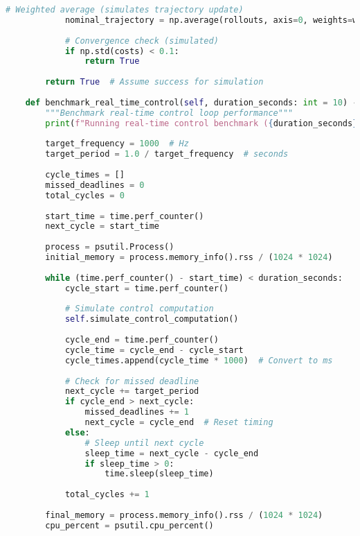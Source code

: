 \begin{lstlisting}[language=Python, caption={Performance Benchmark Script}, label={lst:app-benchmark-script}]
            # Weighted average (simulates trajectory update)
            nominal_trajectory = np.average(rollouts, axis=0, weights=weights)
            
            # Convergence check (simulated)
            if np.std(costs) < 0.1:
                return True
        
        return True  # Assume success for simulation
    
    def benchmark_real_time_control(self, duration_seconds: int = 10) -> BenchmarkResult:
        """Benchmark real-time control loop performance"""
        print(f"Running real-time control benchmark ({duration_seconds}s)...")
        
        target_frequency = 1000  # Hz
        target_period = 1.0 / target_frequency  # seconds
        
        cycle_times = []
        missed_deadlines = 0
        total_cycles = 0
        
        start_time = time.perf_counter()
        next_cycle = start_time
        
        process = psutil.Process()
        initial_memory = process.memory_info().rss / (1024 * 1024)
        
        while (time.perf_counter() - start_time) < duration_seconds:
            cycle_start = time.perf_counter()
            
            # Simulate control computation
            self.simulate_control_computation()
            
            cycle_end = time.perf_counter()
            cycle_time = cycle_end - cycle_start
            cycle_times.append(cycle_time * 1000)  # Convert to ms
            
            # Check for missed deadline
            next_cycle += target_period
            if cycle_end > next_cycle:
                missed_deadlines += 1
                next_cycle = cycle_end  # Reset timing
            else:
                # Sleep until next cycle
                sleep_time = next_cycle - cycle_end
                if sleep_time > 0:
                    time.sleep(sleep_time)
            
            total_cycles += 1
        
        final_memory = process.memory_info().rss / (1024 * 1024)
        cpu_percent = psutil.cpu_percent()
        

\end{lstlisting}
